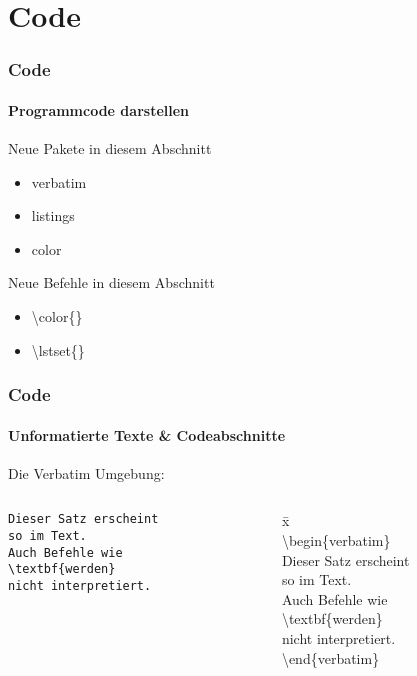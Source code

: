 \section{Code}

\begin{frame}
\frametitle{Code}
\framesubtitle{Programmcode darstellen}

\begin{exampleblock}{Neue Pakete in diesem Abschnitt}
\begin{multicols}{3}
\begin{itemize}
\item verbatim
\item listings
\item color
\end{itemize}
\end{multicols}
\end{exampleblock}

\begin{block}{Neue Befehle in diesem Abschnitt}
\begin{itemize}
\item \color{nounibaredI}\textbackslash color\color{black}\{\}
\item \color{nounibaredI}\textbackslash lstset\color{black}\{\}
\end{itemize}
\end{block}

\end{frame}

\begin{frame}[fragile]
\frametitle{Code}
\framesubtitle{Unformatierte Texte \& Codeabschnitte}
Die Verbatim Umgebung:\\
\begin{columns}
\begin{column}{.5\textwidth}
\begin{verbatim}
Dieser Satz erscheint
so im Text.
Auch Befehle wie
\textbf{werden}
nicht interpretiert.
\end{verbatim}
\end{column}
\begin{column}{.5\textwidth}
\begin{ttfamily}
\begin{tabbing}
x\=\kill\\
\>\color{unibablueI}\textbackslash begin\color{black}\{verbatim\}\\
\>Dieser Satz erscheint\\
\>so im Text.\\
\>Auch Befehle wie\\
\>\textbackslash textbf\{werden\}\\
\>nicht interpretiert.\\
\>\color{unibablueI}\textbackslash end\color{black}\{verbatim\}\\
\end{tabbing}
\end{ttfamily}
\end{column}
\end{columns}
\end{frame}

